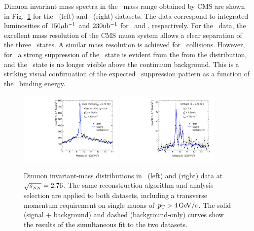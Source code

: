 Dimuon invariant mass spectra in the \PgU\ mass range obtained by CMS are shown in Fig.~\ref{fig:GR:mass} for the \PbPb\ (left) 
and \pp\ (right) datasets. The data correspond to integrated luminosities of $150\mathrm{\mu b^{-1}}$ and $230 \mathrm{nb^{-1}}$ for 
\PbPb\ and \pp, respectively. For the \pp\ data, the excellent mass resolution of the CMS muon system
allows a clear separation of the three \PgUn\ states. A similar mass resolution is achieved for \PbPb\ collisions. 
However, for \PbPb\ a strong suppression of the \PgUb\ state is evident from the from the distribution, and the \PgUc\ state 
is no longer visible above the continuum background. This is a striking visual confirmation of the expected
\PgU\ suppression pattern as a function of the \PgUn\ binding energy.

\begin{figure}[t]
\begin{center}
    \includegraphics[width=0.45\textwidth]{qqbarfigures/hiFitPt4Erf}
    \includegraphics[width=0.45\textwidth]{qqbarfigures/ppFitPt4Erf}
    \caption{Dimuon invariant-mass distributions in \PbPb\ (left) and \pp (right)
data at $\sqrt{s_{_{NN}}} = 2.76$\TeV. The same reconstruction algorithm and analysis selection are applied to both datasets, including a transverse momentum requirement on single muons of $\mbox{$p_{\mathrm{T}}$} > 4\,\mathrm{GeV/c}$. The solid (signal + background) and dashed (background-only) curves show the results of the simultaneous fit to the two datasets.}
    \label{fig:GR:mass}
\end{center}
\end{figure}

